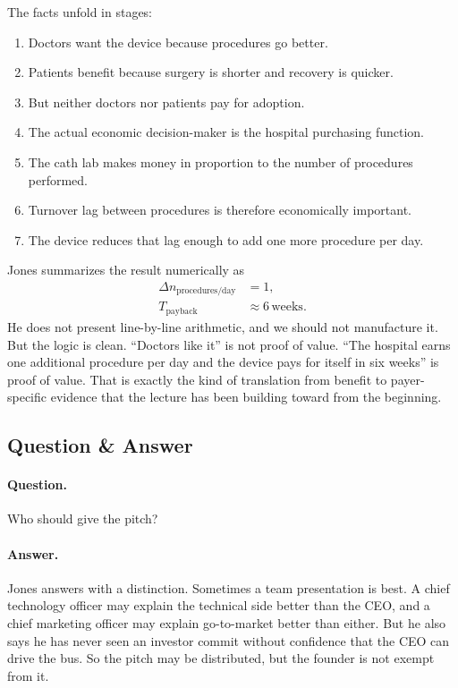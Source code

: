 The facts unfold in stages:
\begin{enumerate}
\item Doctors want the device because procedures go better.
\item Patients benefit because surgery is shorter and recovery is quicker.
\item But neither doctors nor patients pay for adoption.
\item The actual economic decision-maker is the hospital purchasing function.
\item The cath lab makes money in proportion to the number of procedures performed.
\item Turnover lag between procedures is therefore economically important.
\item The device reduces that lag enough to add one more procedure per day.
\end{enumerate}
Jones summarizes the result numerically as
\begin{align}
\Delta n_{\text{procedures/day}} &= 1,\\
T_{\text{payback}} &\approx 6\,\text{weeks}.
\end{align}
He does not present line-by-line arithmetic, and we should not manufacture it. But the logic is clean. ``Doctors like it'' is not proof of value. ``The hospital earns one additional procedure per day and the device pays for itself in six weeks'' is proof of value. That is exactly the kind of translation from benefit to payer-specific evidence that the lecture has been building toward from the beginning.

\subsection{Question \& Answer}

\paragraph{Question.} Who should give the pitch?

\paragraph{Answer.} Jones answers with a distinction. Sometimes a team presentation is best. A chief technology officer may explain the technical side better than the CEO, and a chief marketing officer may explain go-to-market better than either. But he also says he has never seen an investor commit without confidence that the CEO can drive the bus. So the pitch may be distributed, but the founder is not exempt from it.


